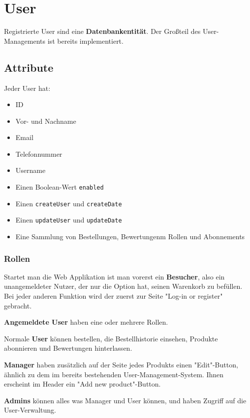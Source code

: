 \documentclass[12pt, a4paper]{scrreprt}
\begin{document}
	
	\chapter{User}
	
	Registrierte User sind eine \textbf{Datenbankentität}. Der Großteil des User-Managements ist bereits implementiert. 
	
		\section{Attribute}
		
		Jeder User hat:
		\begin{itemize}
			\item ID
			\item Vor- und Nachname
			\item Email
			\item Telefonnummer
			\item Username
			\item Einen Boolean-Wert \texttt{enabled}
			\item Einen \texttt{createUser} und \texttt{createDate}
			\item Einen \texttt{updateUser} und \texttt{updateDate}
			\item Eine Sammlung von Bestellungen, Bewertungenm Rollen und Abonnements
		\end{itemize}
	
			\subsection{Rollen}
			
			Startet man die Web Applikation ist man vorerst ein \textbf{Besucher}, also ein unangemeldeter Nutzer, der nur die Option hat, seinen Warenkorb zu befüllen. Bei jeder anderen Funktion wird der zuerst zur Seite "Log-in or register" gebracht.
			
			\textbf{Angemeldete User} haben eine oder mehrere Rollen.
			
			Normale \textbf{User} können bestellen, die Bestellhistorie einsehen, Produkte abonnieren und Bewertungen hinterlassen.
			
			\textbf{Manager} haben zusätzlich auf der Seite jedes Produkts einen "Edit"-Button, ähnlich zu dem im bereits bestehenden User-Management-System. Ihnen erscheint im Header ein "Add new product"-Button.
			
			\textbf{Admins} können alles was Manager und User können, und haben Zugriff auf die User-Verwaltung.
		
\end{document}
